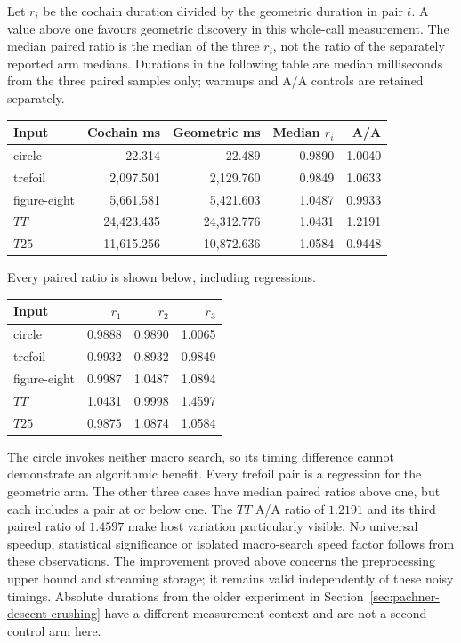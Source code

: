 Let $r_i$ be the cochain duration divided by the geometric duration
in pair $i$.  A value above one favours geometric discovery in this
whole-call measurement.  The median paired ratio is the median of the
three $r_i$, not the ratio of the separately reported arm medians.
Durations in the following table are median milliseconds from the
three paired samples only; warmups and A/A controls are retained
separately.
\begin{center}
\begin{tabular}{lrrrr}
\hline
Input & Cochain ms & Geometric ms & Median $r_i$ & A/A\\
\hline
circle & 22.314 & 22.489 & 0.9890 & 1.0040\\
trefoil & 2,097.501 & 2,129.760 & 0.9849 & 1.0633\\
figure-eight & 5,661.581 & 5,421.603 & 1.0487 & 0.9933\\
$TT$ & 24,423.435 & 24,312.776 & 1.0431 & 1.2191\\
$T25$ & 11,615.256 & 10,872.636 & 1.0584 & 0.9448\\
\hline
\end{tabular}
\end{center}
Every paired ratio is shown below, including regressions.
\begin{center}
\begin{tabular}{lrrr}
\hline
Input & $r_1$ & $r_2$ & $r_3$\\
\hline
circle & 0.9888 & 0.9890 & 1.0065\\
trefoil & 0.9932 & 0.8932 & 0.9849\\
figure-eight & 0.9987 & 1.0487 & 1.0894\\
$TT$ & 1.0431 & 0.9998 & 1.4597\\
$T25$ & 0.9875 & 1.0874 & 1.0584\\
\hline
\end{tabular}
\end{center}
The circle invokes neither macro search, so its timing difference
cannot demonstrate an algorithmic benefit.  Every trefoil pair is a
regression for the geometric arm.  The other three cases have median
paired ratios above one, but each includes a pair at or below one.
The $TT$ A/A ratio of $1.2191$ and its third paired ratio of $1.4597$
make host variation particularly visible.  No universal speedup,
statistical significance or isolated macro-search speed factor follows
from these observations.  The improvement proved above concerns the
preprocessing upper bound and streaming storage; it remains valid
independently of these noisy timings.  Absolute durations from the
older experiment in Section~\ref{sec:pachner-descent-crushing} have a
different measurement context and are not a second control arm here.

